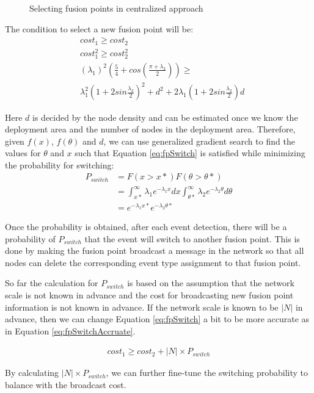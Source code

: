 \begin{figure}
\centering
{}
\caption{Selecting fusion points in centralized approach}
\label{fig:centralizedTED}
\end{figure}

The condition to select a new fusion point will be:
\begin{align}
&cost_1\geq cost_2\nonumber \\
&cost_1^2\geq cost_2^2\nonumber \\
&({\lambda}_1)^2(\frac{5}{4}+cos(\frac{\pi+{\lambda}_2}{2}))\geq\nonumber \\ &{\lambda}_1^2(1+2sin\frac{{\lambda}_2}{2})^2+d^2+2{\lambda}_1(1+2sin\frac{{\lambda}_2}{2})d
\label{eq:fpSwitch}
\end{align}

Here \(d\) is decided by the node density and can be estimated once we know the deployment area and the number of nodes in the deployment area. Therefore, given \(f(x)\), \(f(\theta)\) and \(d\), we can use generalized gradient search to find the values for \(\theta\) and \(x\) such that Equation \ref{eq:fpSwitch} is satisfied while minimizing the probability for switching:
\begin{align*}
P_{switch}&=F(x>x*)F(\theta>\theta *)\\
&=\int_{x*}^{\infty}{\lambda}_1e^{-{\lambda}_1x}dx\int_{\theta *}^{\infty}{\lambda}_2e^{-{\lambda}_2\theta}d\theta\\
&=e^{-{\lambda}_1x*}e^{-{\lambda}_2\theta *}
\end{align*}

Once the probability is obtained, after each event detection, there will be a probability of \(P_{switch}\) that the event will switch to another fusion point. This is done by making the fusion point broadcast a message in the network so that all nodes can delete the corresponding event type assignment to that fusion point.

So far the calculation for \(P_{switch}\) is based on the assumption that the network scale is not known in advance and the cost for broadcasting new fusion point information is not known in advance. If the network scale is known to be \(|N|\) in advance, then we can change Equation \ref{eq:fpSwitch} a bit to be more accurate as in Equation \ref{eq:fpSwitchAccruate}.

\begin{align}
cost_1\geq cost_2+|N|\times P_{switch}
\label{eq:fpSwitchAccruate}
\end{align}

By calculating \(|N|\times P_{switch}\), we can further fine-tune the switching probability to balance with the broadcast cost.